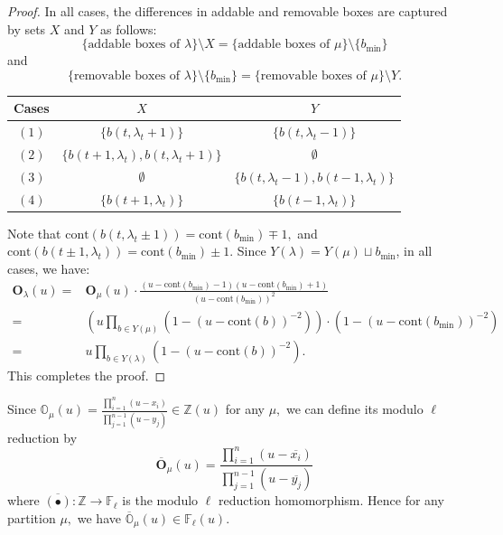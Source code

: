 \documentclass[12pt]{amsart}
\numberwithin{itemcounter}{subsection}
\theoremstyle{plain}
\theoremstyle{definition}
\theoremstyle{remark}
\numberwithin{equation}{section}
\def\bbF{\mathbb{F}}
\def\bbO{\mathbb{O}}
\def\bbZ{\mathbb{Z}}
\def\bfO{\mathbf{O}}
\def\min{{\operatorname{min}\nolimits}}
\begin{document}
\begin{proof}
								In all cases, the differences in addable and removable boxes are captured by sets $X$ and $Y$ as follows:
								$$ \{\text{addable boxes of $\lambda$}\}\setminus X=\{\text{addable boxes of $\mu$}\}\setminus\{b_\min\}$$
								and $$ \{\text{removable boxes of $\lambda$}\}\setminus\{b_\min\}=\{\text{removable boxes of $\mu$}\}\setminus Y.$$
								\begin{center}
									\begin{table}[h]\label{diag:extrasymm}
										\begin{tabular}{c|c|c}
											\hline
											Cases&$X$&$Y$\\\hline
											$(1)$&$ \{b(t,\lambda_t+1)\}$&$\{b(t,\lambda_t-1)\}$\\\hline
											$(2)$&$\{b(t+1,\lambda_{t}),b(t,\lambda_t+1)\}$&$\emptyset$\\\hline    $(3)$&$\emptyset$&$\{b(t,\lambda_{t}-1),b(t-1,\lambda_t)\}$\\\hline
											$(4)$&$\{b(t+1,\lambda_t)\}$&$\{b(t-1,\lambda_t)\}$\\\hline
										\end{tabular}
									\end{table}
								\end{center}
								Note that $\mathrm{cont}(b(t,\lambda_t\pm1))=\mathrm{cont}(b_\min)\mp1,$ and $\mathrm{cont}(b(t\pm1,\lambda_t))=\mathrm{cont}(b_\min)\pm1.$ Since $Y(\lambda)=Y(\mu)\sqcup b_\min$, in all cases, we have:
								\begin{align*}
									\bfO_{\lambda}(u)=&\bfO_{\mu}(u)\cdot \frac{(u-\mathrm{cont}(b_\min)-1)(u-\mathrm{cont}(b_\min)+1)}{(u-\mathrm{cont}(b_\min))^2}\\
									=&(u\prod\limits_{b\in Y(\mu)}(1-(u-\mathrm{cont}(b))^{-2}))\cdot (1-(u-\mathrm{cont}(b_\min))^{-2})\\
									=&u\prod\limits_{b\in Y(\lambda)}(1-(u-\mathrm{cont}(b))^{-2}).
								\end{align*} This completes the proof.
							\end{proof}

									Since $\bbO_{\mu}(u)=\frac{\prod_{i=1}^n(u-x_i)}{\prod_{j=1}^{n-1}(u-y_j)} \in \bbZ(u)$ for any $\mu,$ we can define its modulo $\ell$ reduction by $$\overline{\bfO}_{\mu}(u)=\frac{\prod_{i=1}^n(u-\overline{x_i})}{\prod_{j=1}^{n-1}(u-\overline{y_j})}$$
									where $\overline{(\bullet)}:\bbZ\to \bbF_\ell$ is the modulo $\ell$ reduction homomorphism. Hence for any partition $\mu,$ we have $\overline{\bbO}_{\mu}(u)\in \bbF_\ell(u).$
\end{document}
